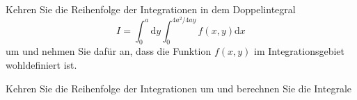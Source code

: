\begin{atiTask}[
  title = Integrationsreihenfolge
]
  \providecommand{\D}{\mathrm{d}}
\begin{atiSubtasks}
\item Kehren Sie die Reihenfolge der Integrationen in dem Doppelintegral
\begin{equation*}
I=\int_0^a \D y\int_0^{4a^2/4ay}f(x,y)\D x
\end{equation*}
um und nehmen Sie dafür an, dass die Funktion $f(x,y)$ im Integrationsgebiet wohldefiniert ist.

\item Kehren Sie die Reihenfolge der Integrationen um und berechnen Sie die Integrale
\begin{atiSubequations}
\item{}
\item{}
\end{atiSubequations}
\end{atiSubtasks}

\end{atiTask}